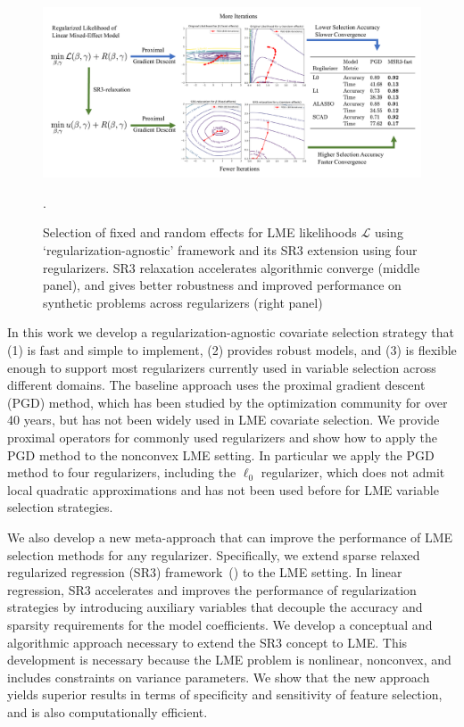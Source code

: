 \begin{figure}[t]
    \centering
    \includegraphics[width=\textwidth]{figures/summary_picture.pdf}
    \caption{Selection of fixed and random effects for LME likelihoods $\mathcal{L}$ using 
    `regularization-agnostic' framework and its SR3 extension using four regularizers. 
    SR3 relaxation accelerates algorithmic converge  (middle panel), and gives better robustness and improved performance on synthetic problems across regularizers (right panel)}.
    \label{fig:summary}
\end{figure}

In this work we develop a regularization-agnostic covariate selection strategy that (1) is fast and simple to implement, (2) provides robust models, and (3) is flexible enough to support most regularizers currently used in variable selection across different domains.  The baseline approach uses the proximal gradient descent (PGD) method, which has been studied by the optimization community for over 40 years, but has not been widely used in LME covariate selection. We provide proximal operators for commonly used regularizers and show how to apply the PGD method to the nonconvex LME setting. In particular we apply the PGD method to four regularizers, 
including the $\ell_0$ regularizer, which does not admit local quadratic approximations and has not been used before for LME variable selection strategies. 

We also develop a new meta-approach that can improve the performance of LME selection methods for any regularizer. Specifically, we extend sparse relaxed regularized regression (SR3) framework~{(\cite{Zheng2019SR3})} to the LME setting. In linear regression, SR3 accelerates and improves the performance of  regularization strategies by introducing auxiliary variables that decouple the accuracy and sparsity requirements for the model coefficients.
We develop a conceptual and algorithmic approach necessary to extend the SR3 concept to LME.  This development is necessary because the LME problem is nonlinear, nonconvex, and includes constraints on variance parameters.  We show that the new approach yields superior results in terms of specificity and sensitivity of feature selection, and is also computationally efficient.  

